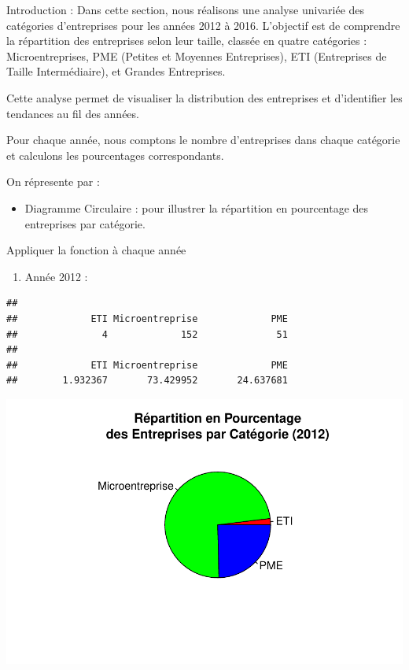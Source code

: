 \documentclass[mstat,12pt]{unswthesis}
\begin{document}
\medskip

Introduction : Dans cette section, nous réalisons une analyse univariée
des catégories d'entreprises pour les années 2012 à 2016. L'objectif est
de comprendre la répartition des entreprises selon leur taille, classée
en quatre catégories : Microentreprises, PME (Petites et Moyennes
Entreprises), ETI (Entreprises de Taille Intermédiaire), et Grandes
Entreprises.

\medskip

Cette analyse permet de visualiser la distribution des entreprises et
d'identifier les tendances au fil des années. \medskip

Pour chaque année, nous comptons le nombre d'entreprises dans chaque
catégorie et calculons les pourcentages correspondants.

\medskip

On répresente par : \medskip

\begin{itemize}
\tightlist
\item
  Diagramme Circulaire : pour illustrer la répartition en pourcentage
  des entreprises par catégorie.
\end{itemize}

\newpage

Appliquer la fonction à chaque année

\medskip

\begin{enumerate}
\def\labelenumi{\arabic{enumi})}
\tightlist
\item
  Année 2012 :
\end{enumerate}

\begin{verbatim}
## 
##             ETI Microentreprise             PME 
##               4             152              51 
## 
##             ETI Microentreprise             PME 
##        1.932367       73.429952       24.637681
\end{verbatim}

\includegraphics{TDDT_projet_L_2_files/figure-latex/analyse_univariee_2012-1.pdf}
\end{document}
